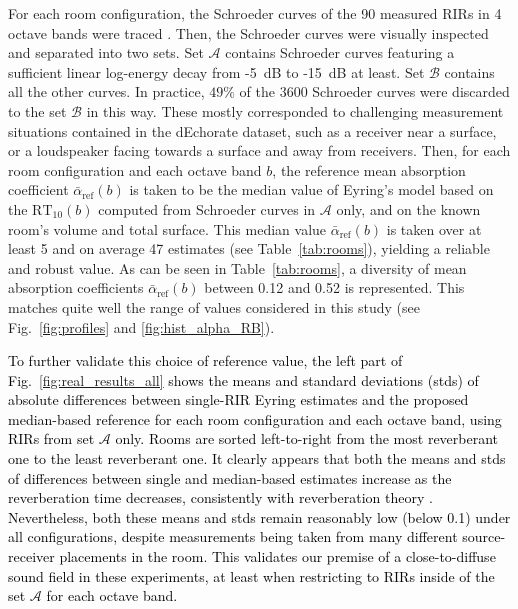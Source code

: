 \documentclass[reprint]{JASA}
\makeatletter
\newif\ifnotes
\newcommand{\note}[1]{\@bsphack\ifnotes{#1}\fi\@esphack}
\makeatother
\begin{document}
For each room configuration, the Schroeder curves of the 90 measured RIRs in 4 octave bands were traced \cite{Schroeder:65}. Then, the Schroeder curves were visually inspected and separated into two sets. Set $\mathcal{A}$ contains Schroeder curves featuring a sufficient linear log-energy decay from -5~dB to -15~dB at least. Set $\mathcal{B}$ contains all the other curves. In practice, $49\%$ of the 3600 Schroeder curves were discarded to the set $\mathcal{B}$ in this way. These mostly corresponded to challenging measurement situations contained in the dEchorate dataset, such as a receiver near a surface, or a loudspeaker facing towards a surface and away from receivers.
Then, for each room configuration and each octave band $b$, the reference mean absorption coefficient $\bar{\alpha}_{\textrm{ref}}(b)$ is taken to be the median value of Eyring's model based on the $\textrm{RT}_{10}(b)$ computed from Schroeder curves in $\mathcal{A}$ only, and on the known room's volume and total surface. This median value $\bar{\alpha}_{\textrm{ref}}(b)$ is taken over at least 5 and on average 47 estimates (see Table~\ref{tab:rooms}), yielding a reliable and robust value. As can be seen in Table~\ref{tab:rooms}, a diversity of mean absorption coefficients $\bar{\alpha}_{\textrm{ref}}(b)$ between 0.12 and 0.52 is represented. This matches quite well the range of values considered in this study (see Fig.~\ref{fig:profiles} and \ref{fig:hist_alpha_RB}).

\note{\sout{Note that aggregating measures from multiple source-receiver pairs in a room is a commonly used technique in room acoustics. A summary of ground truth mean absorption coefficients obtained in this way in the 4 considered octave bands for each of the 10 rooms is provided in Table~\ref{tab:rooms}.}}

\textcolor{black}{To further validate this choice of reference value, the left part of Fig.~\ref{fig:real_results_all} shows the means and standard deviations (stds) of absolute differences between single-RIR Eyring estimates and the proposed median-based reference for each room configuration and each octave band, using RIRs from set $\mathcal{A}$ only. Rooms are sorted left-to-right from the most reverberant one to the least reverberant one. It clearly appears that both the means and stds of differences between single and median-based estimates increase as the reverberation time decreases, consistently with reverberation theory \cite{Hodgson94,Hodgson96}. Nevertheless, both these means and stds remain reasonably low (below 0.1) under all configurations, despite measurements being taken from many different source-receiver placements in the room. This validates our premise of a close-to-diffuse sound field in these experiments, at least when restricting to RIRs inside of the set $\mathcal{A}$ for each octave band.} 
\end{document}
